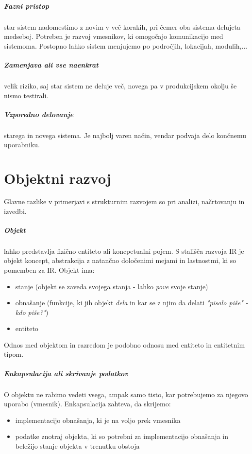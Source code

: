 \documentclass[a4paper,12pt]{report}
\begin{document}
   \paragraph{Fazni pristop} star sistem nadomestimo z novim v več korakih, pri čemer oba sistema delujeta medseboj. Potreben je razvoj
   vmesnikov, ki omogočajo komunikacijo med sistemoma. Postopno lahko sistem menjujemo po področjih, lokacijah, modulih,...

   \paragraph{Zamenjava ali vse naenkrat} velik riziko, saj star sistem ne deluje več, novega pa v produkcijskem okolju še nismo testirali.

   \paragraph{Vzporedno delovanje} starega in novega sistema. Je najbolj varen način, vendar podvaja delo končnemu uporabniku.


\chapter{Objektni razvoj}

   Glavne razlike v primerjavi s strukturnim razvojem so pri analizi, načrtovanju in izvedbi.

   \paragraph{Objekt} lahko predstavlja fizično entiteto ali koncpetualni pojem. S stališča razvoja IR je objekt koncept,
   abstrakcija z natančno določenimi mejami in lastnostmi, ki so pomemben za IR. Objekt ima:
      \begin{itemize}
         \item stanje (objekt se zaveda svojega stanja - lahko \textit{pove} svoje stanje)
         \item obnašanje (funkcije, ki jih objekt \textit{dela} in kar se z njim da delati \textit{"pisalo piše" - kdo piše?"})
         \item entiteto
      \end{itemize}
   Odnos med objektom in razredom je podobno odnosu med entiteto in entitetnim tipom.

   \paragraph{Enkapsulacija ali skrivanje podatkov}
   O objektu ne rabimo vedeti vsega, ampak samo tisto, kar potrebujemo za njegovo uporabo (vmesnik). 
   Enkapsulacija zahteva, da skrijemo:
      \begin{itemize}
         \item implementacijo obnašanja, ki je na voljo prek vmesnika
         \item podatke znotraj objekta, ki so potrebni za implementacijo obnašanja in beležijo stanje objekta v trenutku obstoja
      \end{itemize}
\end{document}
